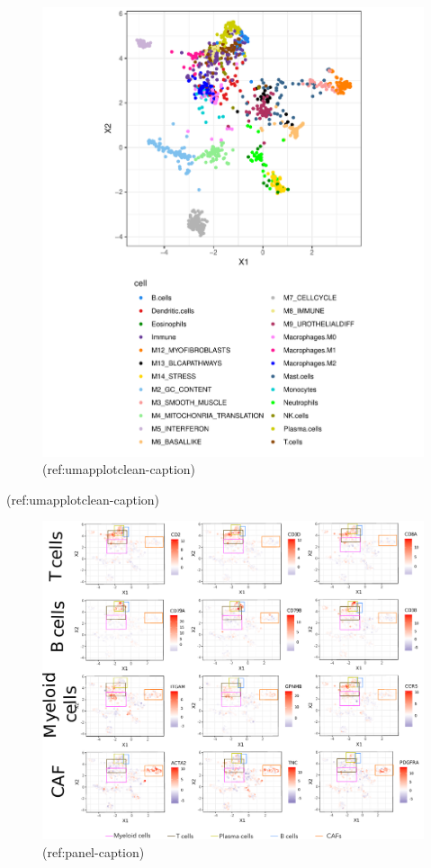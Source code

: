 \documentclass[12pt,]{book}
\theoremstyle{definition}
\theoremstyle{definition}
\theoremstyle{definition}
\theoremstyle{remark}
\begin{document}
\begin{figure}

{\centering \includegraphics[width=0.9\linewidth]{figures-ext/umap_plot_cleaned} 

}

\caption[2D representation of labelled metagenes]{(ref:umapplotclean-caption)}\label{fig:umapplotclean}
\end{figure}

(ref:umapplotclean-caption)

\begin{figure}

{\centering \includegraphics[width=1\linewidth]{figures-ext/panel_markers_labels_gates_legend} 

}

\caption[Cell markers expression in the metagenes]{(ref:panel-caption)}\label{fig:panel}
\end{figure}
\end{document}
